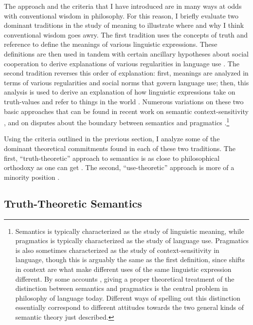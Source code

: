 The approach and the criteria that I have introduced are in many ways at odds with conventional wisdom in philosophy. For this reason, I briefly evaluate two dominant traditions in the study of meaning to illustrate where and why I think conventional wisdom goes awry. The first tradition uses the concepts of truth and reference to define the meanings of various linguistic expressions. These definitions are then used in tandem with certain ancillary hypotheses about social cooperation to derive explanations of various regularities in language use \citep[e.g.,][]{Soames:2010,Lewis:1970,Lewis:1975,Davidson:1967,CappelenLepore:2005,Grice:1975}. The second tradition reverses this order of explanation: first, meanings are analyzed in terms of various regularities and social norms that govern language use; then, this analysis is used to derive an explanation of how linguistic expressions take on truth-values and refer to things in the world \citep[e.g.,][]{Wittgenstein:1953,Brandom:1994,Brandom:2000,Horwich:2005}. Numerous variations on these two basic approaches that can be found in recent work on semantic context-sensitivity \citep{Recanati:2004,CappelenLepore:2005}, and on disputes about the boundary between semantics and pragmatics \citep{Brandom:2000,Recanati:2012}.\footnote{Semantics is typically characterized as the study of linguistic meaning, while pragmatics is typically characterized as the study of language use. Pragmatics is also sometimes characterized as the study of context-sensitivity in language, though this is arguably the same as the first definition, since shifts in context are what make different uses of the same linguistic expression different. By some accounts \citep[e.g.,][]{CappelenLepore:2005}, giving a proper theoretical treatment of the distinction between semantics and pragmatics is the central problem in philosophy of language today. Different ways of spelling out this distinction essentially correspond to different attitudes towards the two general kinds of semantic theory just described.}

Using the criteria outlined in the previous section, I analyze some of the dominant theoretical commitments found in each of these two traditions. The first, ``truth-theoretic'' approach to semantics is as close to philosophical orthodoxy as one can get \citep{Speaks:2014}. The second, ``use-theoretic'' approach is more of a minority position \citep{Stanley:2008,Brandom:1994,Brandom:2000,Horwich:2005}.

\subsection{Truth-Theoretic Semantics}

